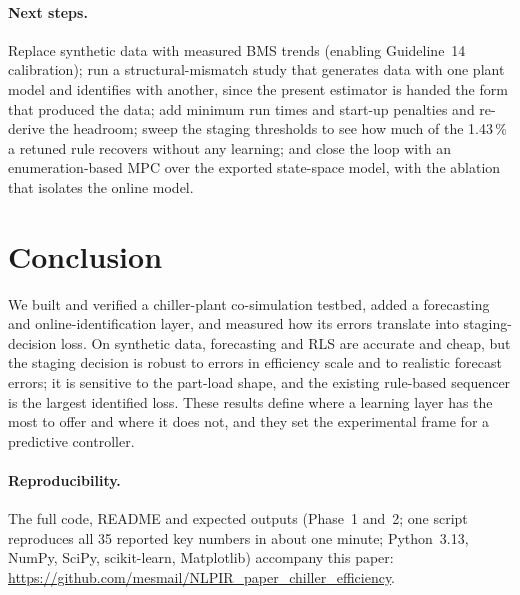 \documentclass{svproc}
\begin{document}
\paragraph{Next steps.} Replace synthetic data with measured BMS trends (enabling Guideline~14 calibration); run a structural-mismatch study that generates data with one plant model and identifies with another, since the present estimator is handed the form that produced the data; add minimum run times and start-up penalties and re-derive the headroom; sweep the staging thresholds to see how much of the 1.43\,\% a retuned rule recovers without any learning; and close the loop with an enumeration-based MPC over the exported state-space model, with the ablation that isolates the online model.

\section{Conclusion}
We built and verified a chiller-plant co-simulation testbed, added a forecasting and online-identification layer, and measured how its errors translate into staging-decision loss. On synthetic data, forecasting and RLS are accurate and cheap, but the staging decision is robust to errors in efficiency scale and to realistic forecast errors; it is sensitive to the part-load shape, and the existing rule-based sequencer is the largest identified loss. These results define where a learning layer has the most to offer and where it does not, and they set the experimental frame for a predictive controller.

\paragraph{Reproducibility.} The full code, README and expected outputs (Phase~1 and~2; one script reproduces all 35 reported key numbers in about one minute; Python~3.13, NumPy, SciPy, scikit-learn, Matplotlib) accompany this paper: \url{https://github.com/mesmail/NLPIR_paper_chiller_efficiency}.
\end{document}
